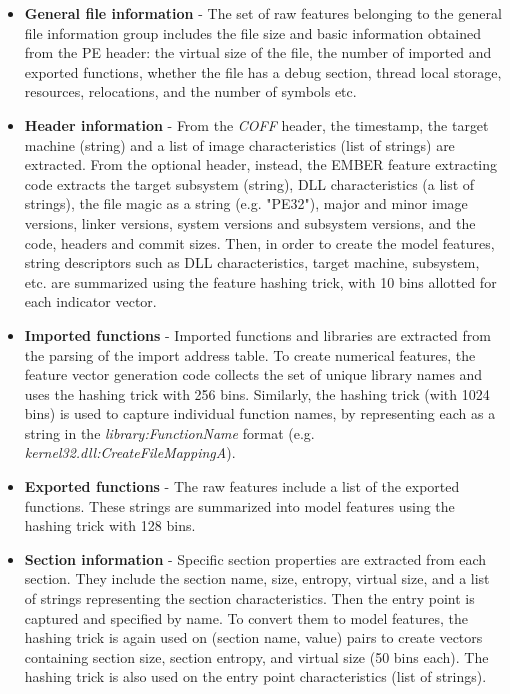\documentclass[pdfa%
,cucitura%
]{toptesi}
\begin{document}
\begin{itemize}
	\item \textbf{General file information} - The set of raw features belonging to the general file information group includes the file size and basic information obtained from the PE header: the virtual size of the file, the number of imported and exported functions, whether the file has a debug section, thread local storage, resources, relocations, and the number of symbols etc.
	
	\item \textbf{Header information} - From the \textit{COFF} header, the timestamp, the target machine (string) and a list of image characteristics (list of strings) are extracted. From the optional header, instead, the EMBER feature extracting code extracts the target subsystem (string), DLL characteristics (a list of strings), the file magic as a string (e.g. "PE32"), major and minor image versions, linker versions, system versions and subsystem versions, and the code, headers and commit sizes. Then, in order to create the model features, string descriptors such as DLL characteristics, target machine, subsystem, etc. are summarized using the feature hashing trick, with 10 bins allotted for each indicator vector.
	
	\item \textbf{Imported functions} - Imported functions and libraries are extracted from the parsing of the import address table. To create numerical features, the feature vector generation code collects the set of unique library names and uses the hashing trick with 256 bins. Similarly, the hashing trick (with 1024 bins) is used to capture individual function names, by representing each as a string in the \textit{library:FunctionName} format (e.g. \textit{kernel32.dll:CreateFileMappingA}).
	
	\item \textbf{Exported functions} - The raw features include a list of the exported functions. These strings are summarized into model features using the hashing trick with 128 bins.
	
	\item \textbf{Section information} - Specific section properties are extracted from each section. They include the section name, size, entropy, virtual size, and a list of strings representing the section characteristics. Then the entry point is captured and specified by name. To convert them to model features, the hashing trick is again used on (section name, value) pairs to create vectors containing section size, section entropy, and virtual size (50 bins each). The hashing trick is also used on the entry point characteristics (list of strings).
\end{itemize}
\end{document}
